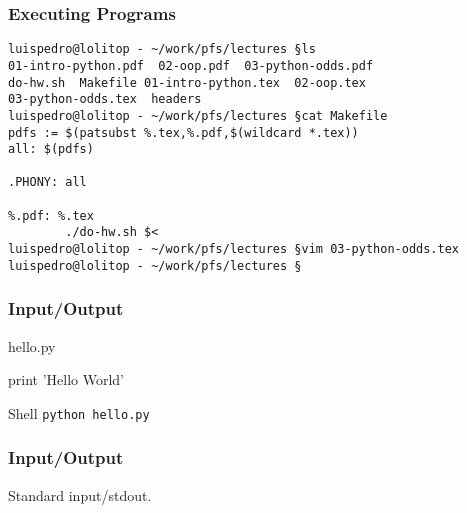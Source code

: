 \begin{frame}[fragile]
\frametitle{Executing Programs}

\begin{verbatim}
luispedro@lolitop - ~/work/pfs/lectures §ls
01-intro-python.pdf  02-oop.pdf  03-python-odds.pdf
do-hw.sh  Makefile 01-intro-python.tex  02-oop.tex
03-python-odds.tex  headers
luispedro@lolitop - ~/work/pfs/lectures §cat Makefile
pdfs := $(patsubst %.tex,%.pdf,$(wildcard *.tex))
all: $(pdfs)

.PHONY: all

%.pdf: %.tex
        ./do-hw.sh $<
luispedro@lolitop - ~/work/pfs/lectures §vim 03-python-odds.tex
luispedro@lolitop - ~/work/pfs/lectures §
\end{verbatim}

\end{frame}

\begin{frame}[fragile]
\frametitle{Input/Output}
\begin{block}{hello.py}
\begin{python}
print 'Hello World'
\end{python}
\end{block}

\begin{block}{Shell}
\texttt{python hello.py}
\end{block}
\end{frame}


\begin{frame}[fragile]
\frametitle{Input/Output}
Standard input/stdout.
\end{frame}

